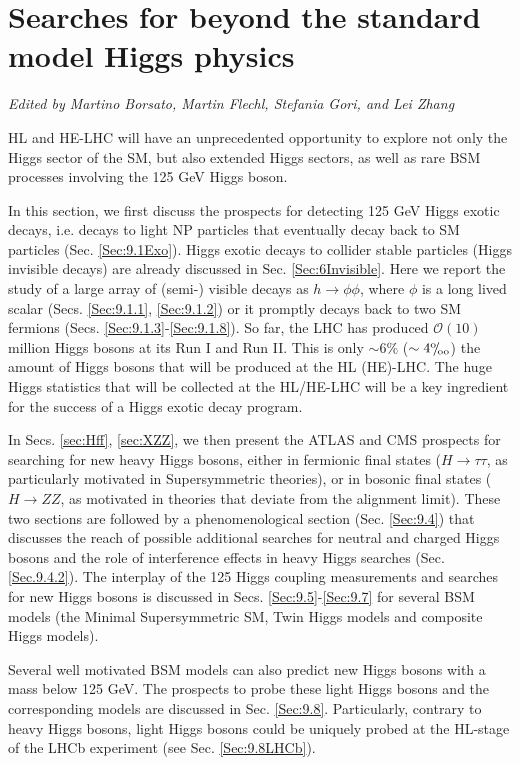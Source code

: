 \documentclass[../report.tex]{subfiles}
\begin{document}
\section{Searches for beyond the standard model Higgs physics\label{sec9}}

\begin{center}
    {\it{Edited by Martino Borsato, Martin Flechl, Stefania Gori, and Lei Zhang}}
\end{center}
HL and HE-LHC will have an unprecedented opportunity to explore not only the Higgs sector of the SM, but also extended Higgs sectors, as well as rare BSM processes involving the 125 GeV Higgs boson. 

In this section, we first discuss the prospects for detecting 125 GeV Higgs exotic decays, i.e. decays to light NP particles that eventually decay back to SM particles (Sec. \ref{Sec:9.1Exo}). Higgs exotic decays to collider stable particles (Higgs invisible decays) are already discussed in Sec. \ref{Sec:6Invisible}. Here we report the study of a large array of (semi-) visible decays as $h\to \phi\phi$, where $\phi$ is a long lived scalar (Secs. \ref{Sec:9.1.1}, \ref{Sec:9.1.2}) or it promptly decays back to two SM fermions (Secs. \ref{Sec:9.1.3}-\ref{Sec:9.1.8}). So far, the LHC has produced $\mathcal O(10)$ million Higgs bosons at its Run I and Run II. This is only $\sim 6\%$ ($\sim 4{}^\text{o}\mkern-5mu/\mkern-3mu_\text{oo}$) the amount of Higgs bosons that will be produced at the HL (HE)-LHC. The huge Higgs statistics that will be collected at the HL/HE-LHC will be a key ingredient for the success of a Higgs exotic decay program. 

In Secs. \ref{sec:Hff}, \ref{sec:XZZ}, we then present the ATLAS and CMS prospects for searching for new heavy Higgs bosons, either in fermionic final states ($H\to\tau\tau$, as particularly motivated in Supersymmetric theories), or in bosonic final states ($H\to ZZ$, as motivated in theories that deviate from the alignment limit). These two sections are followed by a phenomenological section (Sec. \ref{Sec:9.4}) that discusses the reach of possible additional searches for neutral and charged Higgs bosons and the role of interference effects in heavy Higgs searches (Sec. \ref{Sec.9.4.2}). The interplay of the 125 Higgs coupling measurements and searches for new Higgs bosons is discussed in Secs. \ref{Sec:9.5}-\ref{Sec:9.7} for several BSM models (the Minimal Supersymmetric SM, Twin Higgs models and composite Higgs models). 

Several well motivated BSM models can also predict new Higgs bosons with a mass below 125 GeV. The prospects to probe these light Higgs bosons and the corresponding models are discussed in Sec. \ref{Sec:9.8}. Particularly, contrary to heavy Higgs bosons, light Higgs bosons could be uniquely probed at the HL-stage of the LHCb experiment (see Sec. \ref{Sec:9.8LHCb}).
\end{document}
